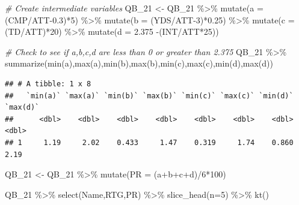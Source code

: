 \documentclass[
  11pt,
]{book}
\newenvironment{Shaded}{\begin{snugshade}}{\end{snugshade}}
\newcommand{\AttributeTok}[1]{\textcolor[rgb]{0.77,0.63,0.00}{#1}}
\newcommand{\CommentTok}[1]{\textcolor[rgb]{0.56,0.35,0.01}{\textit{#1}}}
\newcommand{\DecValTok}[1]{\textcolor[rgb]{0.00,0.00,0.81}{#1}}
\newcommand{\FloatTok}[1]{\textcolor[rgb]{0.00,0.00,0.81}{#1}}
\newcommand{\FunctionTok}[1]{\textcolor[rgb]{0.00,0.00,0.00}{#1}}
\newcommand{\NormalTok}[1]{#1}
\newcommand{\OtherTok}[1]{\textcolor[rgb]{0.56,0.35,0.01}{#1}}
\newcommand{\SpecialCharTok}[1]{\textcolor[rgb]{0.00,0.00,0.00}{#1}}
\theoremstyle{definition}
\theoremstyle{definition}
\theoremstyle{definition}
\theoremstyle{definition}
\theoremstyle{remark}
\begin{document}
\begin{Shaded}
\begin{Highlighting}[]
\CommentTok{\# Create intermediate variables}
\NormalTok{QB\_21 }\OtherTok{\textless{}{-}}\NormalTok{ QB\_21 }\SpecialCharTok{\%\textgreater{}\%} 
  \FunctionTok{mutate}\NormalTok{(}\AttributeTok{a =}\NormalTok{ (CMP}\SpecialCharTok{/}\NormalTok{ATT}\FloatTok{{-}0.3}\NormalTok{)}\SpecialCharTok{*}\DecValTok{5}\NormalTok{) }\SpecialCharTok{\%\textgreater{}\%}
  \FunctionTok{mutate}\NormalTok{(}\AttributeTok{b =}\NormalTok{ (YDS}\SpecialCharTok{/}\NormalTok{ATT}\DecValTok{{-}3}\NormalTok{)}\SpecialCharTok{*}\FloatTok{0.25}\NormalTok{) }\SpecialCharTok{\%\textgreater{}\%}
  \FunctionTok{mutate}\NormalTok{(}\AttributeTok{c =}\NormalTok{ (TD}\SpecialCharTok{/}\NormalTok{ATT)}\SpecialCharTok{*}\DecValTok{20}\NormalTok{) }\SpecialCharTok{\%\textgreater{}\%}
  \FunctionTok{mutate}\NormalTok{(}\AttributeTok{d =} \FloatTok{2.375} \SpecialCharTok{{-}}\NormalTok{(INT}\SpecialCharTok{/}\NormalTok{ATT}\SpecialCharTok{*}\DecValTok{25}\NormalTok{))}

\CommentTok{\# Check to see if a,b,c,d are less than 0 or greater than 2.375}
\NormalTok{QB\_21 }\SpecialCharTok{\%\textgreater{}\%} \FunctionTok{summarize}\NormalTok{(}\FunctionTok{min}\NormalTok{(a),}\FunctionTok{max}\NormalTok{(a),}\FunctionTok{min}\NormalTok{(b),}\FunctionTok{max}\NormalTok{(b),}\FunctionTok{min}\NormalTok{(c),}\FunctionTok{max}\NormalTok{(c),}\FunctionTok{min}\NormalTok{(d),}\FunctionTok{max}\NormalTok{(d))}
\end{Highlighting}
\end{Shaded}

\begin{verbatim}
## # A tibble: 1 x 8
##   `min(a)` `max(a)` `min(b)` `max(b)` `min(c)` `max(c)` `min(d)` `max(d)`
##      <dbl>    <dbl>    <dbl>    <dbl>    <dbl>    <dbl>    <dbl>    <dbl>
## 1     1.19     2.02    0.433     1.47    0.319     1.74    0.860     2.19
\end{verbatim}

\begin{Shaded}
\begin{Highlighting}[]
\NormalTok{QB\_21 }\OtherTok{\textless{}{-}}\NormalTok{ QB\_21 }\SpecialCharTok{\%\textgreater{}\%}
  \FunctionTok{mutate}\NormalTok{(}\AttributeTok{PR =}\NormalTok{ (a}\SpecialCharTok{+}\NormalTok{b}\SpecialCharTok{+}\NormalTok{c}\SpecialCharTok{+}\NormalTok{d)}\SpecialCharTok{/}\DecValTok{6}\SpecialCharTok{*}\DecValTok{100}\NormalTok{)}

\NormalTok{QB\_21 }\SpecialCharTok{\%\textgreater{}\%} \FunctionTok{select}\NormalTok{(Name,RTG,PR) }\SpecialCharTok{\%\textgreater{}\%} \FunctionTok{slice\_head}\NormalTok{(}\AttributeTok{n=}\DecValTok{5}\NormalTok{) }\SpecialCharTok{\%\textgreater{}\%} \FunctionTok{kt}\NormalTok{()}
\end{Highlighting}
\end{Shaded}
\end{document}
